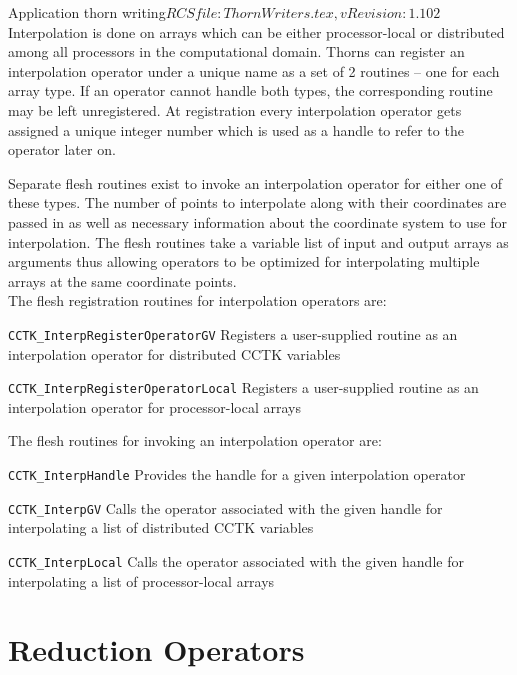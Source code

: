 \begin{cactuspart}{2}{Application thorn writing}{$RCSfile: ThornWriters.tex,v $}{$Revision: 1.102 $}
Interpolation is done on arrays which can be either processor-local or
distributed among all processors in the computational domain. Thorns
can register an interpolation operator under a unique name as a set of
2 routines -- one for each array type. If an operator cannot handle
both types, the corresponding routine may be left unregistered. At
registration every interpolation operator gets assigned a unique
integer number which is used as a handle to refer to the operator
later on.

Separate flesh routines exist to invoke an interpolation operator for
either one of these types. The number of points to interpolate along
with their coordinates are passed in as well as necessary information
about the coordinate system to use for interpolation.  The flesh
routines take a variable list of input and output arrays as arguments
thus allowing operators to be optimized for interpolating multiple
arrays at the same coordinate points.\\

The flesh registration routines for interpolation operators are:
\begin{Lentry}
  \item[{\tt CCTK\_InterpRegisterOperatorGV}]
    Registers a user-supplied routine as an interpolation operator for
    distributed CCTK variables
  \item[{\tt CCTK\_InterpRegisterOperatorLocal}]
    Registers a user-supplied routine as an interpolation operator for
    processor-local arrays
\end{Lentry}

The flesh routines for invoking an interpolation operator are:
\begin{Lentry}
  \item[{\tt CCTK\_InterpHandle}]
    Provides the handle for a given interpolation operator
  \item[{\tt CCTK\_InterpGV}]
    Calls the operator associated with the given handle
    for interpolating a list of distributed CCTK variables
  \item[{\tt CCTK\_InterpLocal}]
    Calls the operator associated with the given handle
    for interpolating a list of processor-local arrays
\end{Lentry}


\section{Reduction Operators}
\label{sec:reop}


\end{cactuspart}
